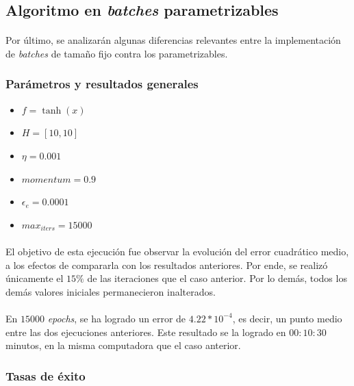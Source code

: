 \documentclass[12pt, twocolumn]{article}
\begin{document}
	\subsection{Algoritmo en \textit{batches} parametrizables}
	
	\paragraph{} Por último, se analizarán algunas diferencias relevantes entre la implementación de \textit{batches} de tamaño fijo contra los parametrizables.
	
	\subsubsection{Parámetros y resultados generales} 
	
	\begin{itemize}
		\item $f = \tanh(x)$
		\item $H = \left[10, 10\right]$
		\item $\eta = 0.001$
		\item $momentum = 0.9$
		\item $\epsilon_{e} = 0.0001$
		\item $max_{iters} = 15000$
	\end{itemize}
	
	\paragraph{} El objetivo de esta ejecución fue observar la evolución del error cuadrático medio, a los efectos de compararla con los resultados anteriores. Por ende, se realizó únicamente el $15\%$ de las iteraciones que el caso anterior. Por lo demás, todos los demás valores iniciales permanecieron inalterados. 
	
	\paragraph{} En $15000$ \textit{epochs}, se ha logrado un error de $4.22*10^{-4}$, es decir, un punto medio entre las dos ejecuciones anteriores. Este resultado se la logrado en $00:10:30$ minutos, en la misma computadora que el caso anterior. 
	
	\subsubsection{Tasas de éxito}
	
\end{document}
